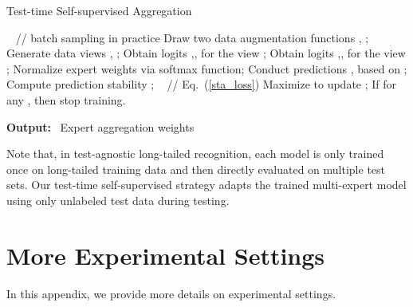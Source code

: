 \documentclass{article}
\newcommand{\return}{\textbf{Output:}}
\begin{document}
\begin{algorithm}
\caption{Test-time Self-supervised Aggregation}
\label{algo_SADE} 
\begin{algorithmic}[1]
\small
{}
\For{}  ~ // batch sampling in practice 
\State Draw two data augmentation functions , ;
\State Generate data views , ;
\State Obtain logits ,, for the view  ;
\State Obtain logits ,, for the view ;
\State Normalize expert weights  via softmax function;
\State Conduct predictions , based on ;  
\State Compute prediction stability   ; ~ // Eq.~(\ref{sta_loss})
\State Maximize   to update ;
\EndFor
\State If  for any , then stop training. 
\EndFor 

\hspace{-0.5in}\return ~ Expert aggregation weights  
\end{algorithmic} 
\end{algorithm} 


Note that,  in test-agnostic long-tailed recognition,  each model is only trained once on long-tailed training data and then directly evaluated on multiple test sets.
Our test-time self-supervised strategy  adapts the trained multi-expert model using only unlabeled test data during testing.

\clearpage
\section{More Experimental Settings}\label{App_C}
In this appendix, we provide more details on experimental settings. 
\end{document}
